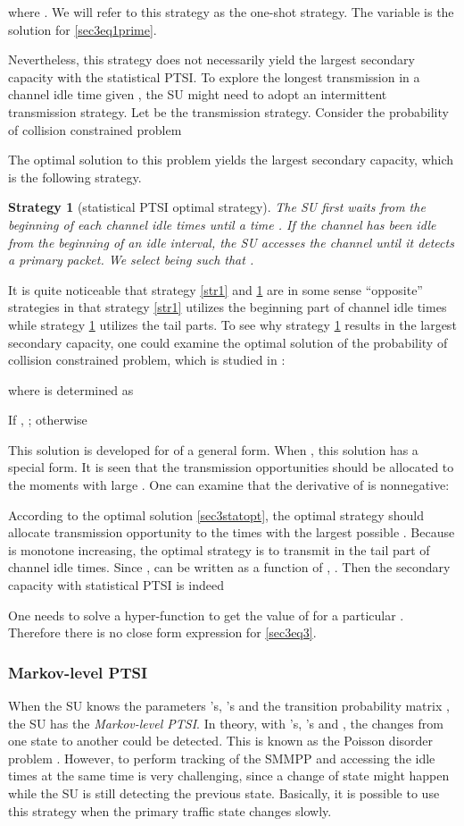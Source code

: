 \documentclass[10pt,final,journal,letterpaper]{IEEEtran}
\newtheorem{strategy}{Strategy}
\begin{document}
where . We will refer to this strategy as the one-shot strategy. The variable  is the solution for \eqref{sec3eq1prime}.

\par
Nevertheless, this strategy does not necessarily yield the largest secondary capacity with the statistical PTSI. To explore the longest transmission in a channel idle time given , the SU might need to adopt an intermittent transmission strategy. Let  be the transmission strategy. Consider the probability of collision constrained problem

The optimal solution to this problem yields the largest secondary capacity, which is the following strategy.
\begin{strategy}[statistical PTSI optimal strategy]\label{str2}
The SU first waits from the beginning of each channel idle times until a time . If the channel has been idle from the beginning of an idle interval, the SU accesses the channel until it detects a primary packet. We select  being such that .
\end{strategy}
It is quite noticeable that strategy \ref{str1} and \ref{str2} are in some sense ``opposite'' strategies in that strategy \ref{str1} utilizes the beginning part of channel idle times while strategy \ref{str2} utilizes the tail parts. To see why strategy \ref{str2} results in the largest secondary capacity, one could examine the optimal solution of the probability of collision constrained problem, which is studied in \cite{huang2009optimal}:

where  is determined as

If , ; otherwise

This solution is developed for  of a general form. When , this solution has a special form. It is seen that the transmission opportunities should be allocated to the moments with large . One can examine that the derivative of  is nonnegative:

According to the optimal solution \eqref{sec3statopt}, the optimal strategy should allocate transmission opportunity to the times with the largest possible . Because  is monotone increasing, the optimal strategy is to transmit in the tail part of channel idle times. Since ,  can be written as a function of , . Then the secondary capacity with statistical PTSI is indeed

One needs to solve a hyper-function to get the value of  for a particular . Therefore there is no close form expression for \eqref{sec3eq3}.

\subsubsection{Markov-level PTSI}
When the SU knows the parameters 's, 's and the transition probability matrix , the SU has the \emph{Markov-level PTSI}. In theory, with 's, 's and , the changes from one state to another could be detected. This is known as the Poisson disorder problem \cite{peskir2002solving}. However, to perform tracking of the SMMPP and accessing the idle times at the same time is very challenging, since a change of state might happen while the SU is still detecting the previous state. Basically, it is possible to use this strategy when the primary traffic state changes slowly.
\end{document}
